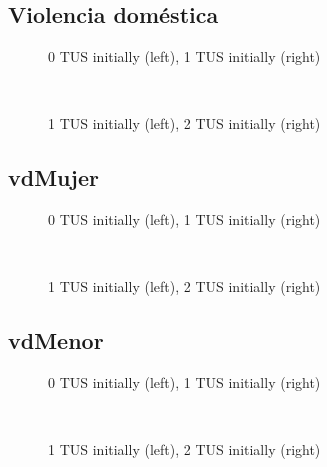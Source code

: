 \documentclass[12pt]{article}
\begin{document}
\subsection{Violencia doméstica}
\begin{figure}[H]%
	\centering
	\caption*{0 TUS initially (left), 1 TUS initially (right)}
	 \quad 
	 \\
	
	\caption*{1 TUS initially (left), 2 TUS initially (right)}
	 \qquad
	\label{fig:vdTwo}%
\end{figure}

\subsection{vdMujer}
\begin{figure}[H]%
	\centering
	\caption*{0 TUS initially (left), 1 TUS initially (right)}
	 \quad 
	 \\
	
	\caption*{1 TUS initially (left), 2 TUS initially (right)}
	 \qquad
	\label{fig:vdMujerTwo}%
\end{figure}

\subsection{vdMenor}
\begin{figure}[H]%
	\centering
	\caption*{0 TUS initially (left), 1 TUS initially (right)}
	 \quad 
	 \\
	
	\caption*{1 TUS initially (left), 2 TUS initially (right)}
	 \qquad
	\label{fig:vdMenorTwo}%
\end{figure}
\end{document}
